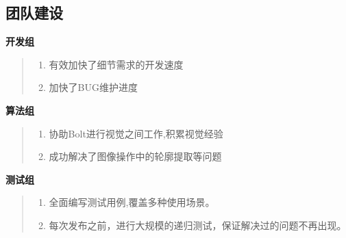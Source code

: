 \documentclass[AutoFakeBold,AutoFakeSlant]{beamer}
\begin{document}
	\subsection{团队建设}
	\begin{frame}[fragile]
		\large
		
		\footnotesize 
		\linespread{1.5} \selectfont
		\textbf{\large 开发组}
		\begin{quote}
			\begin{enumerate}
				\item 有效加快了细节需求的开发速度
				\item 加快了BUG维护进度
			\end{enumerate}
		\end{quote}
		
		\bigskip
		\bigskip
		
		\begin{minipage}[l]{0.5\linewidth}
			\footnotesize 
			\linespread{1.5} \selectfont
			\textbf{\large 算法组}\\
			\begin{quote}
				\begin{enumerate}
					\item 协助Bolt进行视觉之间工作,积累视觉经验
					\item 成功解决了图像操作中的轮廓提取等问题
				\end{enumerate}
			\end{quote}
		\end{minipage}\hfill
		\begin{minipage}[l]{0.5\linewidth}
			\footnotesize 
			\linespread{1.5} \selectfont
			\textbf{\large 测试组}\\
			\begin{quote}
				\begin{enumerate}
					\item 全面编写测试用例,覆盖多种使用场景。
					\item 每次发布之前，进行大规模的递归测试，保证解决过的问题不再出现。
				\end{enumerate}
			\end{quote}
		\end{minipage}
	\end{frame}
	
	
\end{document}
